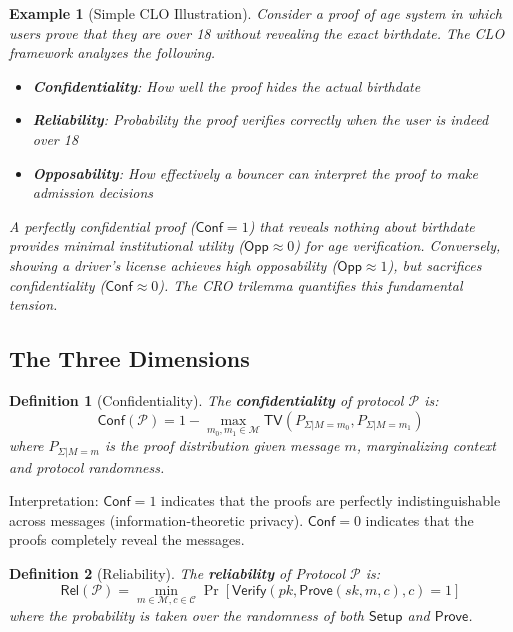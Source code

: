 \documentclass{ieeeaccess}
\newtheorem{definition}{Definition}[subsection]
\newtheorem{example}{Example}[subsection]
\begin{document}
\begin{example}[Simple CLO Illustration]
Consider a \emph{proof of age} system in which users prove that they are over 18 without revealing the exact birthdate. The CLO framework analyzes the following.
\begin{itemize}
\item \textbf{Confidentiality}: How well the proof hides the actual birthdate
\item \textbf{Reliability}: Probability the proof verifies correctly when the user is indeed over 18
\item \textbf{Opposability}: How effectively a bouncer can interpret the proof to make admission decisions
\end{itemize}
A perfectly confidential proof ($\mathsf{Conf} = 1$) that reveals nothing about birthdate provides minimal institutional utility ($\mathsf{Opp} \approx 0$) for age verification. Conversely, showing a driver's license achieves high opposability ($\mathsf{Opp} \approx 1$), but sacrifices confidentiality ($\mathsf{Conf} \approx 0$). The CRO trilemma quantifies this fundamental tension.
\end{example}

\subsection{The Three Dimensions}

\begin{definition}[Confidentiality]\label{def:confidentiality}
The \textbf{confidentiality} of protocol $\mathcal{P}$ is:
\begin{equation}
\mathsf{Conf}(\mathcal{P}) = 1 - \max_{m_0, m_1 \in \mathcal{M}} \mathsf{TV}(P_{\Sigma|M=m_0}, P_{\Sigma|M=m_1})
\end{equation}
where $P_{\Sigma|M=m}$ is the proof distribution given message $m$, marginalizing context and protocol randomness.
\end{definition}

Interpretation: $\mathsf{Conf} = 1$ indicates that the proofs are perfectly indistinguishable across messages (information-theoretic privacy). $\mathsf{Conf} = 0$ indicates that the proofs completely reveal the messages.

\begin{definition}[Reliability]\label{def:reliability}
The \textbf{reliability} of Protocol $\mathcal{P}$ is:
\begin{equation}
\mathsf{Rel}(\mathcal{P}) = \min_{m \in \mathcal{M}, c \in \mathcal{C}} \Pr[\mathsf{Verify}(pk, \mathsf{Prove}(sk,m,c), c) = 1]
\end{equation}
where the probability is taken over the randomness of both $\mathsf{Setup}$ and $\mathsf{Prove}$.
\end{definition}
\end{document}
